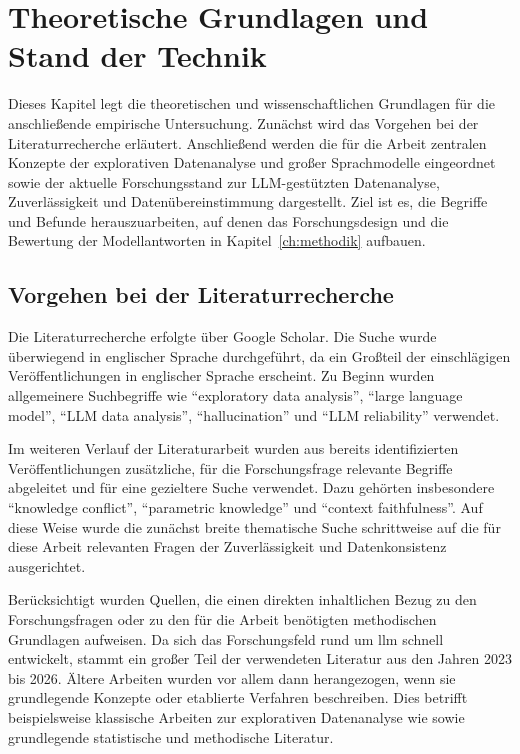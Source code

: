 \chapter{Theoretische Grundlagen und Stand der Technik}
\label{ch:grundlagen}

Dieses Kapitel legt die theoretischen und wissenschaftlichen Grundlagen für die anschließende empirische Untersuchung. Zunächst wird das Vorgehen bei der Literaturrecherche erläutert. Anschließend werden die für die Arbeit zentralen Konzepte der explorativen Datenanalyse und großer Sprachmodelle eingeordnet sowie der aktuelle Forschungsstand zur LLM-gestützten Datenanalyse, Zuverlässigkeit und Datenübereinstimmung dargestellt. Ziel ist es, die Begriffe und Befunde herauszuarbeiten, auf denen das Forschungsdesign und die Bewertung der Modellantworten in Kapitel~\ref{ch:methodik} aufbauen.

\section{Vorgehen bei der Literaturrecherche}

Die Literaturrecherche erfolgte über Google Scholar. Die Suche wurde überwiegend in englischer Sprache durchgeführt, da ein Großteil der einschlägigen Veröffentlichungen in englischer Sprache erscheint. Zu Beginn wurden allgemeinere Suchbegriffe wie \enquote{exploratory data analysis}, \enquote{large language model}, \enquote{LLM data analysis}, \enquote{hallucination} und \enquote{LLM reliability} verwendet.

Im weiteren Verlauf der Literaturarbeit wurden aus bereits identifizierten Veröffentlichungen zusätzliche, für die Forschungsfrage relevante Begriffe abgeleitet und für eine gezieltere Suche verwendet. Dazu gehörten insbesondere \enquote{knowledge conflict}, \enquote{parametric knowledge} und \enquote{context faithfulness}. Auf diese Weise wurde die zunächst breite thematische Suche schrittweise auf die für diese Arbeit relevanten Fragen der Zuverlässigkeit und Datenkonsistenz ausgerichtet.

Berücksichtigt wurden Quellen, die einen direkten inhaltlichen Bezug zu den Forschungsfragen oder zu den für die Arbeit benötigten methodischen Grundlagen aufweisen. Da sich das Forschungsfeld rund um \gls{llm} schnell entwickelt, stammt ein großer Teil der verwendeten Literatur aus den Jahren 2023 bis 2026. Ältere Arbeiten wurden vor allem dann herangezogen, wenn sie grundlegende Konzepte oder etablierte Verfahren beschreiben. Dies betrifft beispielsweise klassische Arbeiten zur explorativen Datenanalyse wie \textcite{tukey1977eda} sowie grundlegende statistische und methodische Literatur.

